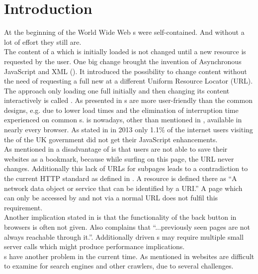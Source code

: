 \section{Introduction\label{chap:introduction}}
At the beginning of the World Wide Web \webPage{}s were self-contained. 
And without a lot of effort they still are. 
\\
The content of a \webPage{} which is initially loaded is not changed until a new resource is requested by the user.
One big change brought the invention of Asynchronous JavaScript and XML (\ajax{}).
It introduced the possibility to change content without the need of requesting a full new \webPage{} at a different Uniform Resource Locator (URL).
The approach only loading one full \webPage{} initially and then changing its content interactively is called \singlePageApplication{}.
As presented in \cite{jonsson2009database} \singlePageApplication{}s are more user-friendly than the common designs, e.g. due to lower load times and the elimination of interruption time experienced on common \webApplication{}s.
\ajax{} is nowadays, other than mentioned in \cite{jonsson2009database}, available in nearly every browser.
As stated in \cite{herlihy2013howmany} in 2013 only 1.1\% of the internet users visiting the \webSite{} of the UK government did not get their JavaScript enhancements.
\\
As mentioned in \cite{jonsson2009database} a disadvantage of \ajax{} is that users are not able to save their websites as a bookmark, because while surfing on this page, the URL never changes.
Additionally this lack of URLs for subpages leads to a contradiction to the current HTTP standard as defined in \cite{fielding1999hypertext}.
A resource is defined there as \enquote{A network data object or service that can be identified by a URI.}
A page which can only be accessed by \ajax{} and not via a normal URL does not fulfil this requirement.
\\
Another implication stated in \cite{jonsson2009database} is that the functionality of the back button in browsers is often not given.
Also \cite{estrada2011take} complains that \enquote{...previously seen pages are not always reachable through it.}.
Additionally \ajax{} driven \webApplication{}s may require multiple small server calls which might produce performance implications.
\\
\SinglePageApplication{}s have another problem in the current time. 
As mentioned in \cite{matter2008ajax} \ajax{} websites are difficult to examine for search engines and other crawlers, due to several challenges.
